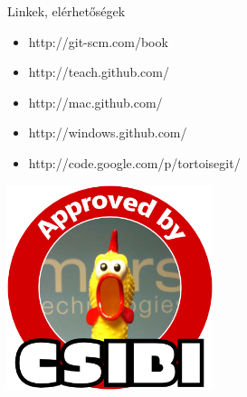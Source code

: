 \documentclass[display,t]{beamer}
\begin{document}
\begin{frame}{Linkek, elérhetőségek}
    \begin{itemize}
        \item http://git-scm.com/book
        \item http://teach.github.com/
        \item http://mac.github.com/
        \item http://windows.github.com/
        \item http://code.google.com/p/tortoisegit/
    \end{itemize}
\end{frame}

\begin{frame}
    \begin{center}
        \includegraphics[width=6cm]{approved_by_csibi.png}
    \end{center}
\end{frame}
\end{document}
